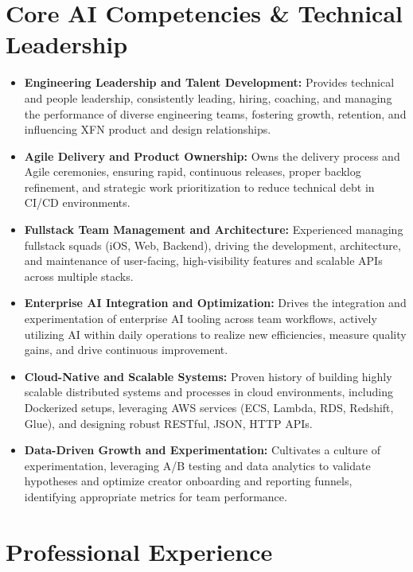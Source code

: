 \documentclass[9pt, letterpaper]{extarticle}
\begin{document}
\section{Core AI Competencies \& Technical Leadership}
\begin{itemize}
\item \textbf{Engineering Leadership  and  Talent Development:} Provides technical and people leadership, consistently leading, hiring, coaching, and managing the performance of diverse engineering teams, fostering growth, retention, and influencing XFN product and design relationships.\item \textbf{Agile Delivery  and  Product Ownership:} Owns the delivery process and Agile ceremonies, ensuring rapid, continuous releases, proper backlog refinement, and strategic work prioritization to reduce technical debt in CI/CD environments.\item \textbf{Fullstack Team Management  and  Architecture:} Experienced managing fullstack squads (iOS, Web, Backend), driving the development, architecture, and maintenance of user-facing, high-visibility features and scalable APIs across multiple stacks.\item \textbf{Enterprise AI Integration  and  Optimization:} Drives the integration and experimentation of enterprise AI tooling across team workflows, actively utilizing AI within daily operations to realize new efficiencies, measure quality gains, and drive continuous improvement.\item \textbf{Cloud-Native  and  Scalable Systems:} Proven history of building highly scalable distributed systems and processes in cloud environments, including Dockerized setups, leveraging AWS services (ECS, Lambda, RDS, Redshift, Glue), and designing robust RESTful, JSON, HTTP APIs.\item \textbf{Data-Driven Growth  and  Experimentation:} Cultivates a culture of experimentation, leveraging A/B testing and data analytics to validate hypotheses and optimize creator onboarding and reporting funnels, identifying appropriate metrics for team performance.
\end{itemize}

\section{Professional Experience}
\end{document}
